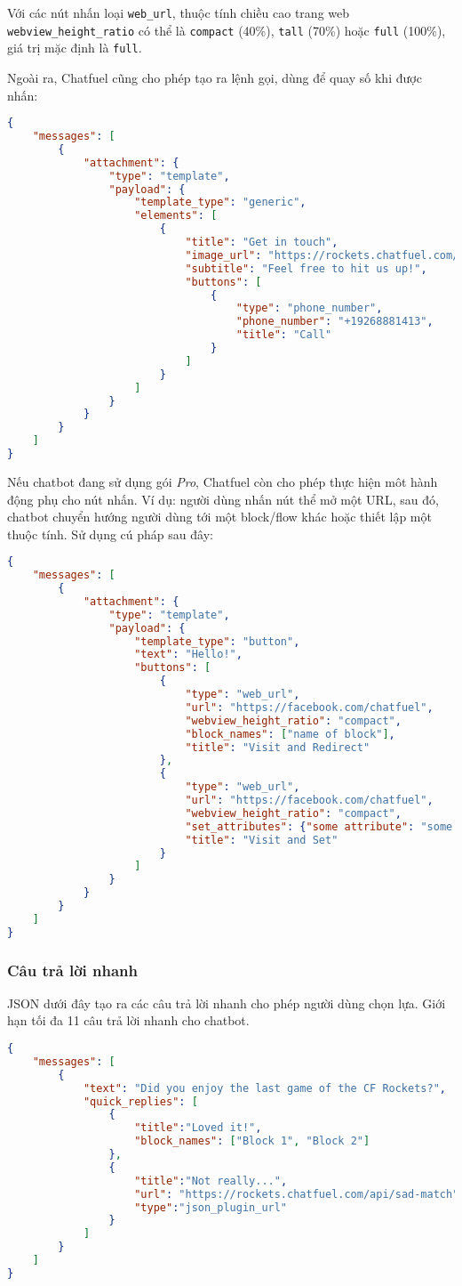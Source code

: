 Với các nút nhấn loại \texttt{web\_url}, thuộc tính chiều cao trang web \texttt{webview\_height\_ratio} có thể là \texttt{compact} (40\%), \texttt{tall} (70\%) hoặc \texttt{full} (100\%), giá trị mặc định là \texttt{full}.\par
Ngoài ra, Chatfuel cũng cho phép tạo ra lệnh gọi, dùng để quay số khi được nhấn:
\begin{lstlisting}[language=json]
{
	"messages": [
		{
			"attachment": {
				"type": "template",
				"payload": {
					"template_type": "generic",
					"elements": [
						{
							"title": "Get in touch",
							"image_url": "https://rockets.chatfuel.com/assets/contact.jpg",
							"subtitle": "Feel free to hit us up!",
							"buttons": [
								{
									"type": "phone_number",
									"phone_number": "+19268881413",
									"title": "Call"
								}
							]
						}
					]
				}
			}
		}
	]
}
\end{lstlisting}\par

Nếu chatbot đang sử dụng gói \textit{Pro}, Chatfuel còn cho phép thực hiện môt hành động phụ cho nút nhấn. Ví dụ: người dùng nhấn nút thể mở một URL, sau đó, chatbot chuyển hướng người dùng tới một block/flow khác hoặc thiết lập một thuộc tính. Sử dụng cú pháp sau đây:
\begin{lstlisting}[language=json]
{
	"messages": [
		{
			"attachment": {
				"type": "template",
				"payload": {
					"template_type": "button",
					"text": "Hello!",
					"buttons": [
						{
							"type": "web_url",
							"url": "https://facebook.com/chatfuel",
							"webview_height_ratio": "compact",
							"block_names": ["name of block"],
							"title": "Visit and Redirect"
						},
						{
							"type": "web_url",
							"url": "https://facebook.com/chatfuel",
							"webview_height_ratio": "compact",
							"set_attributes": {"some attribute": "some value"},
							"title": "Visit and Set"
						}
					]
				}
			}
		}
	]
}
\end{lstlisting}

\subsubsection{Câu trả lời nhanh}
JSON dưới đây tạo ra các câu trả lời nhanh cho phép người dùng chọn lựa. Giới hạn tối đa 11 câu trả lời nhanh cho chatbot.
\begin{lstlisting}[language=json]
{
	"messages": [
		{
			"text": "Did you enjoy the last game of the CF Rockets?",
			"quick_replies": [
				{
					"title":"Loved it!",
					"block_names": ["Block 1", "Block 2"]
				},
				{
					"title":"Not really...",
					"url": "https://rockets.chatfuel.com/api/sad-match",
					"type":"json_plugin_url"
				}
			]
		}
	]
}
\end{lstlisting}\par


